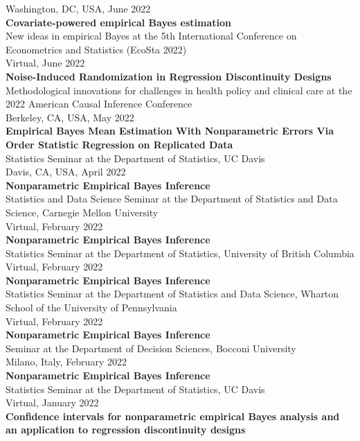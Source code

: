 \documentclass[margin,line]{res}
\begin{document}
\begin{resume}
\begin{adjustwidth*}{0pt}{0pt}
Washington, DC, USA, June 2022
 \\
\textbf{Covariate-powered empirical Bayes estimation} \\
New ideas in empirical Bayes at the 5th International Conference on Econometrics and Statistics (EcoSta 2022) \\
Virtual, June 2022
 \\
\textbf{Noise-Induced Randomization in Regression Discontinuity Designs} \\
Methodological innovations for challenges in health policy and clinical care at the 2022 American Causal Inference Conference \\
Berkeley, CA, USA, May 2022
 \\
\textbf{Empirical Bayes Mean Estimation With Nonparametric Errors Via Order Statistic Regression on Replicated Data} \\
Statistics Seminar at the Department of Statistics, UC Davis \\
Davis, CA, USA, April 2022
 \\
\textbf{Nonparametric Empirical Bayes Inference} \\
Statistics and Data Science Seminar at the Department of Statistics and Data Science, Carnegie Mellon University \\
Virtual, February 2022
 \\
\textbf{Nonparametric Empirical Bayes Inference} \\
Statistics Seminar at the Department of Statistics, University of British Columbia \\
Virtual, February 2022
 \\
\textbf{Nonparametric Empirical Bayes Inference} \\
Statistics Seminar at the Department of Statistics and Data Science, Wharton School of the University of Pennsylvania \\
Virtual, February 2022
 \\
\textbf{Nonparametric Empirical Bayes Inference} \\
Seminar at the Department of Decision Sciences, Bocconi University \\
Milano, Italy, February 2022
 \\
\textbf{Nonparametric Empirical Bayes Inference} \\
Statistics Seminar at the Department of Statistics, UC Davis \\
Virtual, January 2022
 \\
\textbf{Confidence intervals for nonparametric empirical Bayes analysis and an application to regression discontinuity designs} \\

\end{adjustwidth*}
\end{resume}
\end{document}
